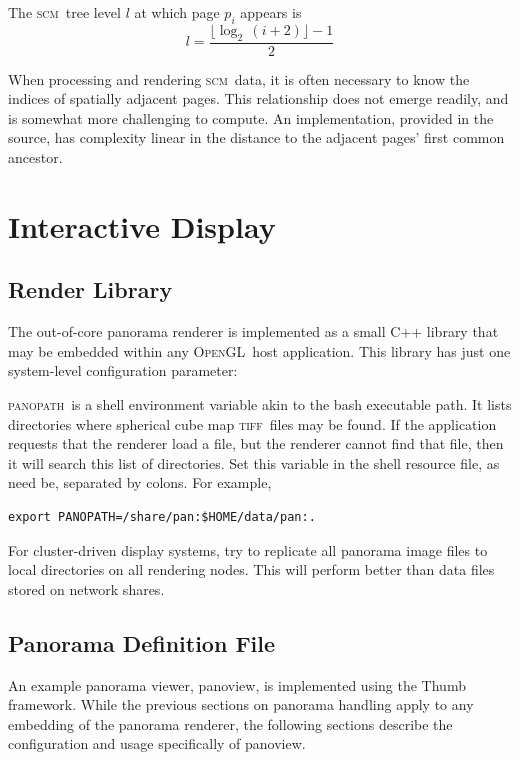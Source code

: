 \documentclass[oneside,11pt]{memoir}
\newcommand{\opengl}  {\textsc{OpenGL}}
\newcommand{\scm}     {\textsc{scm}}
\newcommand{\tiff}    {\textsc{tiff}}
\newcommand{\panopath}{\textsc{panopath}}
\begin{document}
\begin{Spacing}{1.1}
The \scm\ tree level $l$ at which page $p_i$ appears is
\[l=\frac{\lfloor\log_2\,(i+2)\rfloor - 1}{2}\]

When processing and rendering \scm\ data, it is often necessary to know the indices of spatially adjacent pages. This relationship does not emerge readily, and is somewhat more challenging to compute. An implementation, provided in the source, has complexity linear in the distance to the adjacent pages' first common ancestor.


\chapter{Interactive Display}

\section{Render Library}

The out-of-core panorama renderer is implemented as a small C++ library that may be embedded within any \opengl\ host application. This library has just one system-level configuration parameter:

\panopath\ is a shell environment variable akin to the bash executable path. It lists directories where spherical cube map \tiff\ files may be found. If the application requests that the renderer load a file, but the renderer cannot find that file, then it will search this list of directories. Set this variable in the shell resource file, as need be, separated by colons. For example,

\begin{verbatim}
export PANOPATH=/share/pan:$HOME/data/pan:.
\end{verbatim}

For cluster-driven display systems, try to replicate all panorama image files to local directories on all rendering nodes. This will perform better than data files stored on network shares.

\section{Panorama Definition File}

An example panorama viewer, panoview, is implemented using the Thumb framework. While the previous sections on panorama handling apply to any embedding of the panorama renderer, the following sections describe the configuration and usage specifically of panoview.


\end{Spacing}
\end{document}
